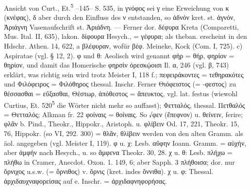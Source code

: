 Ansicht von Curt., Et.\textsuperscript{5} --145-- S. 535, in γνόφος sei γ eine Erweichung von κ (κνέφας), δ aber durch den Einfluss des ν entstanden, so ἁδνόν kret. st. ἁγνόν, Ἀριάγνη Vasenaufschrift st. Ἀριάδνη. — Ferner dor. δέφυρα Kreta (Comparetti, Mus. Ital. II, 635), lakon. δίφουρα Hesych., = γέφυρα; als theban. erscheint in den Hdschr. Athen. 14, 622, a βλέφυραν, wofür βέφ. Meineke, Kock (Com. I, 725). c) Aspiratae (vgl. § 12, 2). φ und θ: Aeolisch wird genannt φήρ = θήρ, φηρίον = θηρίον, und damit das Homerische φηρσὶν ὀρεσκῴοισι Il. α, 246 (vgl. β, 743) erklärt, was richtig sein wird trotz Meister I, 118 f.; πεφειράκοντες = τεθηρακότες und Φιλόφειρος = Φιλόθηρος thessal. Inschr. Ferner  Θιόφειστος (= -φεστος) zu θέσσασθαι = εὔξασθαι, Θέστωρ, ἀπόθεστος = ἄπευκτος, vgl. lat. festus (wiewohl Curtius, Et. 520\textsuperscript{5} die Wörter nicht mehr so auffasst);  Φετταλός, thessal. Πετθαλός = Θετταλός; Alkman fr. 22 φοίναις = θοίναις. So √φεν (ἔπεφνον) u. θείνειν, ferire; φλᾶν b. Pind., Theokr., Hippokr., Aristoph. u. φλίβειν Od. 17, 221, Theokr. 15, 76, Hippokr. (so VI, 292. 300) = θλᾶν, θλίβειν werden von den alten Gramm. als äol. angegeben (vgl. Meister I, 119). φ u. χ: Lesb. αὔφην Ioann. Gramm. = αὐχήν, aber ἀμφήν nach Hesych., u. so ἄμφενα Theokr. 30, 28. χ u. θ: Lesb. πλήχω = πλήθω in Cramer, Anecdot. Oxon. 1. 149, 6; aber Sapph. 3 πλήθοισα; dor. nur ὄρνιχος u.s.w. (= ὄρνιθος) v. ὄρνις (kret. indes ὄννιθα). χ u. φ: Thessal. ἀρχιδαυχναφορείσας auf e. Inschr. = ἀρχιδαφνηφορήσας.
